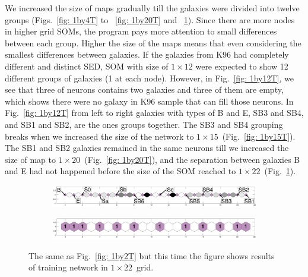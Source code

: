             We increased the size of maps gradually till the galaxies were divided into twelve groups (Figs.~\ref{fig: 1by4T} to ~\ref{fig: 1by20T} and ~\ref{fig: 1by22T}).
            Since there are more nodes in higher grid SOMs, the program pays more attention to small differences between each group.
            Higher the size of the maps means that even considering the smallest differences between galaxies.
            If the galaxies from K96 had completely different and distinct SED, SOM with size of $1\times12$ were expected to show 12 different groups of galaxies (1 at each node).
            However, in Fig.~\ref{fig: 1by12T}, we see that three of neurons contains two galaxies and three of them are empty, which shows there were no galaxy in K96 sample that can fill those neurons.
            In Fig.~\ref{fig: 1by12T} from left to right galaxies with types of B and E, SB3 and SB4, and SB1 and SB2, are the ones groups together. 
            The SB3 and SB4 grouping breaks when we increased the size of the network to $1\times15$~(Fig.~\ref{fig: 1by15T}).
            The SB1 and SB2 galaxies remained in the same neurons till we increased the size of map to $1\times20$~(Fig.~\ref{fig: 1by20T}), and the separation between galaxies B and E had not happened before the size of the SOM reached to $1\times22$~(Fig.~\ref{fig: 1by22T}).
        \begin{figure}
            \begin{subfigure}[b]{\textwidth}
                \centering
                \includegraphics[width=\textwidth]{../images0.01/1d/dist_1_by_22.png}
            \end{subfigure}
            \hfill
            \begin{subfigure}[b]{\textwidth}
                \includegraphics[width=\textwidth]{../images0.01/1d/hit_t_1_by_22.png}
            \end{subfigure}
            \caption{The same as Fig.~\ref{fig: 1by2T} but this time the figure shows results of training network in $1\times22$~grid.}
            \label{fig: 1by22T}
        \end{figure} %
    

